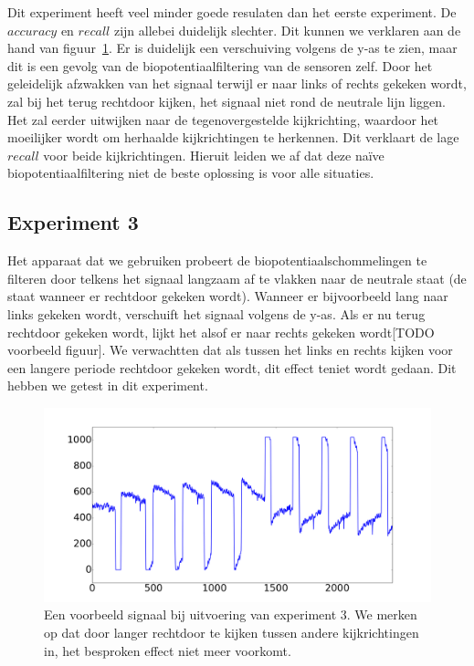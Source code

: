 \documentclass{article}
\begin{document}
Dit experiment heeft veel minder goede resulaten dan het eerste experiment. De $accuracy$ en $recall$ zijn allebei duidelijk slechter. Dit kunnen we verklaren aan de hand van figuur~\ref{fig:exp2}. Er is duidelijk een verschuiving volgens de y-as te zien, maar dit is een gevolg van de biopotentiaalfiltering van de sensoren zelf. Door het geleidelijk afzwakken van het signaal terwijl er naar links of rechts gekeken wordt, zal bij het terug rechtdoor kijken, het signaal niet rond de neutrale lijn liggen. Het zal eerder uitwijken naar de tegenovergestelde kijkrichting, waardoor het moeilijker wordt om herhaalde kijkrichtingen te herkennen. Dit verklaart de lage $recall$ voor beide kijkrichtingen. Hieruit leiden we af dat deze naïve biopotentiaalfiltering niet de beste oplossing is voor alle situaties.

\subsection{Experiment 3}

Het apparaat dat we gebruiken probeert de biopotentiaalschommelingen te filteren door telkens het signaal langzaam af te vlakken naar de neutrale staat (de staat wanneer er rechtdoor gekeken wordt). Wanneer er bijvoorbeeld lang naar links gekeken wordt, verschuift het signaal volgens de y-as. Als er nu terug rechtdoor gekeken wordt, lijkt het alsof er naar rechts gekeken wordt[TODO voorbeeld figuur]. We verwachtten dat als tussen het links en rechts kijken voor een langere periode rechtdoor gekeken wordt, dit effect teniet wordt gedaan. Dit hebben we getest in dit experiment.

\begin{figure}[h]
\centering
\includegraphics[width=\linewidth]{images/experiment3}
\caption{Een voorbeeld signaal bij uitvoering van experiment 3. We merken op dat door langer rechtdoor te kijken tussen andere kijkrichtingen in, het besproken effect niet meer voorkomt. }
\label{fig:exp2}
\end{figure}
\end{document}
